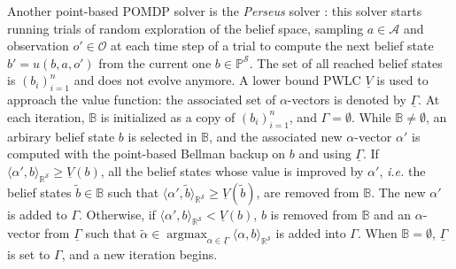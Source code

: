 Another point-based POMDP solver is the \textit{Perseus} solver \cite{Spaan04techrep}:
this solver starts running trials of random exploration of the belief space,
sampling $a \in \mathcal{A}$ and observation $o' \in \mathcal{O}$ at each time step of a trial 
to compute the next belief state $b'=u(b,a,o')$ from the current one $b \in \mathbb{P}^{\mathcal{S}}$.
The set of all reached belief states is $(b_i)_{i=1}^{n}$ and does not evolve anymore. 
A lower bound PWLC $\underline{V}$ is used to approach the value function:
the associated set of $\alpha$-vectors is denoted by $\underline{\Gamma}$.
At each iteration, $\mathbb{B}$ is initialized as a copy of $(b_i)_{i=1}^{n}$,
and $\Gamma = \emptyset$. 
While $\mathbb{B} \neq \emptyset$, an arbirary belief state $b$ is selected in $\mathbb{B}$,
and the associated new $\alpha$-vector $\alpha'$ is computed with the point-based Bellman backup on $b$ 
and using $\underline{\Gamma}$.
If $\langle \alpha', b \rangle_{\mathbb{R}^{\mathcal{S}}} \geqslant \underline{V}(b)$,
all the belief states whose value is improved by $\alpha'$,
\textit{i.e.} the belief states $\tilde{b} \in \mathbb{B}$ such that
$\langle \alpha', \tilde{b} \rangle_{\mathbb{R}^{\mathcal{S}}} \geqslant \underline{V}(\tilde{b}) $, are removed from $\mathbb{B}$.
The new $\alpha'$ is added to $\Gamma$.
Otherwise, if $\langle \alpha', b \rangle_{\mathbb{R}^{\mathcal{S}}} < \underline{V}(b)$,
$b$ is removed from $\mathbb{B}$ and an $\alpha$-vector from  
$\underline{\Gamma}$ such that $\tilde{\alpha} \in \operatorname*{argmax}_{\alpha \in \underline{\Gamma}} \langle \alpha, b \rangle_{\mathbb{R}^{\mathcal{S}}}$ 
is added into $\Gamma$. When $\mathbb{B} = \emptyset$, $\underline{\Gamma}$ is set to $\Gamma$,
and a new iteration begins.


